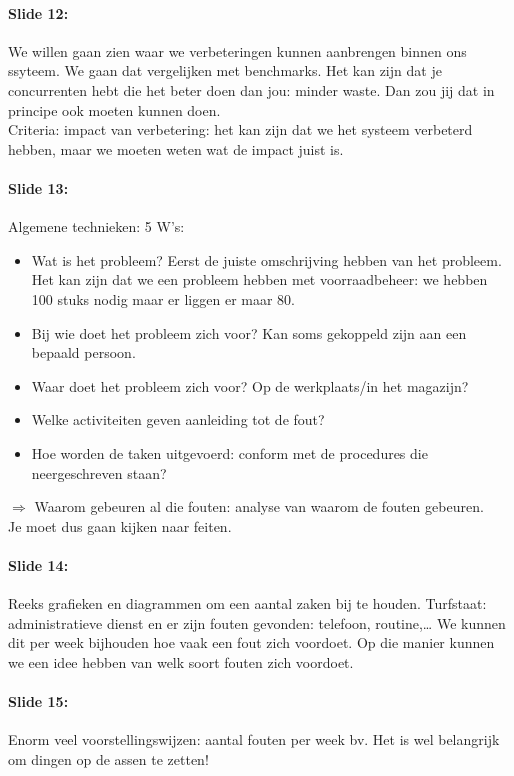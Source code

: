 \documentclass[10pt,a4paper]{report}
\begin{document}
\paragraph{Slide 12:} We willen gaan zien waar we verbeteringen kunnen aanbrengen binnen ons ssyteem. We gaan dat vergelijken met benchmarks. Het kan zijn dat je concurrenten hebt die het beter doen dan jou: minder waste. Dan zou jij dat in principe ook moeten kunnen doen. \\
Criteria: impact van verbetering: het kan zijn dat we het systeem verbeterd hebben, maar we moeten weten wat de impact juist is.

\paragraph{Slide 13:} Algemene technieken: 5 W's:
\begin{itemize}
\item Wat is het probleem? Eerst de juiste omschrijving hebben van het probleem. Het kan zijn dat we een probleem hebben met voorraadbeheer: we hebben 100 stuks nodig maar er liggen er maar 80.
\item Bij wie doet het probleem zich voor? Kan soms gekoppeld zijn aan een bepaald persoon.
\item Waar doet het probleem zich voor? Op de werkplaats/in het magazijn?
\item Welke activiteiten geven aanleiding tot de fout?
\item Hoe worden de taken uitgevoerd: conform met de procedures die neergeschreven staan?
\end{itemize}
$\Rightarrow$ Waarom gebeuren al die fouten: analyse van waarom de fouten gebeuren.\\
Je moet dus gaan kijken naar feiten. 

\paragraph{Slide 14:} Reeks grafieken en diagrammen om een aantal zaken bij te houden. Turfstaat: administratieve dienst en er zijn fouten gevonden: telefoon, routine,… We kunnen dit per week bijhouden hoe vaak een fout zich voordoet. Op die manier kunnen we een idee hebben van welk soort fouten zich voordoet.

\paragraph{Slide 15:} Enorm veel voorstellingswijzen: aantal fouten per week bv. Het is wel belangrijk om dingen op de assen te zetten!
\end{document}
